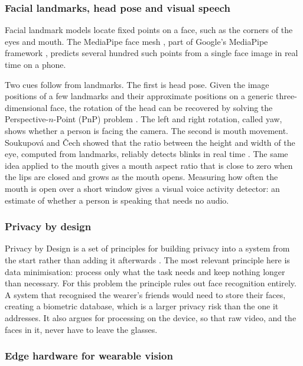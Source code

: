 \subsubsection{Facial landmarks, head pose and visual speech}

Facial landmark models locate fixed points on a face, such as the corners of the eyes and
mouth. The MediaPipe face mesh \cite{kartynnik2019facemesh}, part of Google's MediaPipe
framework \cite{lugaresi2019mediapipe}, predicts several hundred such points from a single
face image in real time on a phone.

Two cues follow from landmarks. The first is head pose. Given the image positions of a few
landmarks and their approximate positions on a generic three-dimensional face, the
rotation of the head can be recovered by solving the Perspective-$n$-Point (PnP) problem
\cite{lepetit2009epnp}. The left and right rotation, called yaw, shows whether a person is
facing the camera. The second is mouth movement. Soukupov\'a and \v{C}ech showed that the
ratio between the height and width of the eye, computed from landmarks, reliably detects
blinks in real time \cite{soukupova2016}. The same idea applied to the mouth gives a mouth
aspect ratio that is close to zero when the lips are closed and grows as the mouth opens.
Measuring how often the mouth is open over a short window gives a visual voice activity
detector: an estimate of whether a person is speaking that needs no audio.

\subsubsection{Privacy by design}

Privacy by Design is a set of principles for building privacy into a system from the start
rather than adding it afterwards \cite{cavoukian2009pbd}. The most relevant principle here
is data minimisation: process only what the task needs and keep nothing longer than
necessary. For this problem the principle rules out face recognition entirely. A system
that recognised the wearer's friends would need to store their faces, creating a
biometric database, which is a larger privacy risk than the one it addresses. It also
argues for processing on the device, so that raw video, and the faces in it, never have to
leave the glasses.

\subsubsection{Edge hardware for wearable vision}

